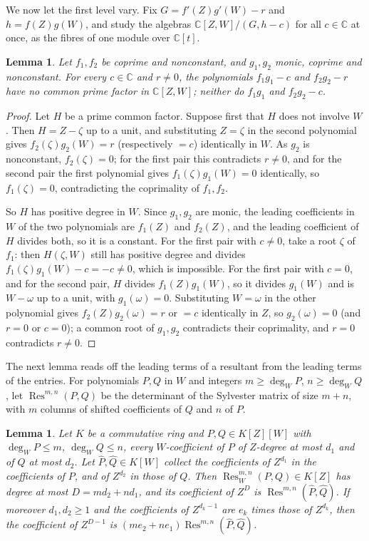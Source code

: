 \documentclass[11pt]{amsart}
\newtheorem{lemma}[theorem]{Lemma}
\theoremstyle{remark}\newtheorem{remark}[theorem]{Remark}
\theoremstyle{definition}\newtheorem{example}[theorem]{Example}
\newcommand{\C}{\mathbb{C}}
\newcommand{\Res}{\operatorname{Res}}
\begin{document}
We now let the first level vary. Fix $G=f'(Z)g'(W)-r$ and $h=f(Z)g(W)$, and study the algebras
$\C[Z,W]/(G,h-c)$ for all $c\in\C$ at once, as the fibres of one module over $\C[t]$.

\begin{lemma}\label{lem:nocommon}
Let $f_1,f_2$ be coprime and nonconstant, and $g_1,g_2$ monic, coprime and nonconstant. For every $c\in\C$ and
$r\ne0$, the polynomials $f_1g_1-c$ and $f_2g_2-r$ have no common prime factor in $\C[Z,W]$; neither do $f_1g_1$ and
$f_2g_2-c$.
\end{lemma}

\begin{proof}
Let $H$ be a prime common factor. Suppose first that $H$ does not involve $W$. Then $H=Z-\zeta$ up to a unit, and
substituting $Z=\zeta$ in the second polynomial gives $f_2(\zeta)g_2(W)=r$ (respectively $=c$) identically in $W$.
As $g_2$ is nonconstant, $f_2(\zeta)=0$; for the first pair this contradicts $r\ne0$, and for the second pair the
first polynomial gives $f_1(\zeta)g_1(W)=0$ identically, so $f_1(\zeta)=0$, contradicting the coprimality of $f_1,f_2$.

So $H$ has positive degree in $W$. Since $g_1,g_2$ are monic, the leading coefficients in $W$ of the two polynomials
are $f_1(Z)$ and $f_2(Z)$, and the leading coefficient of $H$ divides both, so it is a constant. For the first pair
with $c\ne0$, take a root $\zeta$ of $f_1$: then $H(\zeta,W)$ still has positive degree and divides
$f_1(\zeta)g_1(W)-c=-c\ne0$, which is impossible. For the first pair with $c=0$, and for the second pair, $H$ divides
$f_1(Z)g_1(W)$, so it divides $g_1(W)$ and is $W-\omega$ up to a unit, with $g_1(\omega)=0$. Substituting $W=\omega$
in the other polynomial gives $f_2(Z)g_2(\omega)=r$ or $=c$ identically in $Z$, so $g_2(\omega)=0$ (and $r=0$ or
$c=0$); a common root of $g_1,g_2$ contradicts their coprimality, and $r=0$ contradicts $r\ne0$.
\end{proof}

The next lemma reads off the leading terms of a resultant from the leading terms of the entries. For polynomials
$P,Q$ in $W$ and integers $m\ge\deg_WP$, $n\ge\deg_WQ$, let $\Res^{m,n}(P,Q)$ be the determinant of the Sylvester
matrix of size $m+n$, with $m$ columns of shifted coefficients of $Q$ and $n$ of $P$.

\begin{lemma}\label{lem:restop}
Let $K$ be a commutative ring and $P,Q\in K[Z][W]$ with $\deg_WP\le m$, $\deg_WQ\le n$, every $W$-coefficient of
$P$ of $Z$-degree at most $d_1$ and of $Q$ at most $d_2$. Let $\hat P,\hat Q\in K[W]$ collect the coefficients of
$Z^{d_1}$ in the coefficients of $P$, and of $Z^{d_2}$ in those of $Q$. Then $\Res^{m,n}_W(P,Q)\in K[Z]$ has degree at
most $D=md_2+nd_1$, and its coefficient of $Z^{D}$ is $\Res^{m,n}(\hat P,\hat Q)$. If moreover $d_1,d_2\ge1$ and
the coefficients of $Z^{d_k-1}$ are $e_k$ times those of $Z^{d_k}$, then the coefficient of $Z^{D-1}$ is
$(me_2+ne_1)\Res^{m,n}(\hat P,\hat Q)$.
\end{lemma}
\end{document}
